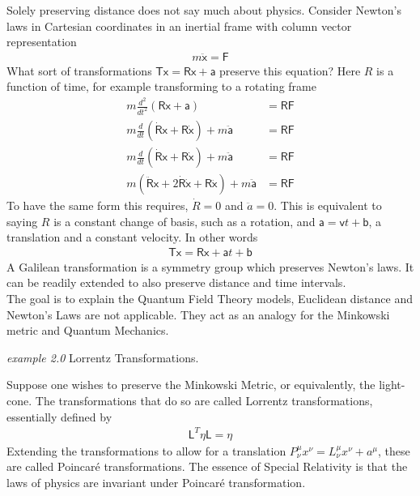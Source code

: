 \documentclass[twocolumn,floatfix,aps,prd,amsmath,amssymb]{revtex4}
\begin{document}
Solely preserving distance does not say much about physics. Consider Newton's laws in Cartesian coordinates in an inertial frame with column vector representation
\begin{align*}
m \ddot{\mathsf{x}} = \mathsf{F}
\end{align*}
What sort of transformations $\mathsf{Tx}=\mathsf{Rx}+\mathsf{a}$ preserve this equation? Here $R$ is a function of time, for example transforming to a rotating frame
\begin{align*} 
m \frac{d^2}{dt^2}(\mathsf{Rx+a}) &= \mathsf{RF} 
\\
m \frac{d}{dt}(\dot{\mathsf{R}} \mathsf{x} + \mathsf{R} \dot{\mathsf{x}} )+m\ddot{\mathsf{a}} &= \mathsf{RF} \\
m \frac{d}{dt}(\dot{\mathsf{R}} \mathsf{x} + \mathsf{R} \dot{\mathsf{x}} )+m\ddot{\mathsf{a}}&= \mathsf{RF} \\
m (\ddot{\mathsf{R}} \mathsf{x} + 2\dot{\mathsf{R}} \dot{\mathsf{x}}+\mathsf{R} \ddot{\mathsf{x}} )+m\ddot{\mathsf{a}} &= \mathsf{RF} 
\end{align*}
To have the same form this requires, $\dot{R}=0$ and $\ddot{a}=0$. This is equivalent to saying $R$ is a constant change of basis, such as a rotation, and $\mathsf{a} = \mathsf{v}t + \mathsf{b}$, a translation and a constant velocity. In other words
\begin{align*}
\mathsf{Tx} =  \mathsf{Rx} + \mathsf{a}t+\mathsf{b}
\end{align*}
A Galilean transformation is a symmetry group which preserves Newton's laws. It can be readily extended to also preserve distance and time intervals. \\

The goal is to explain the Quantum Field Theory models, Euclidean distance and Newton's Laws are not applicable. They act as an analogy for the Minkowski metric and Quantum Mechanics.

\begin{flushleft}\textit{example 2.0} Lorrentz Transformations. \end{flushleft}
Suppose one wishes to preserve the Minkowski Metric, or equivalently, the light-cone. The transformations that do so are called Lorrentz transformations, essentially defined by
\begin{align*}
\mathsf{L}^T \mathsf{\eta} \mathsf{L} = \mathsf{\eta}
\end{align*}
Extending the transformations to allow for a translation $P^\mu_\nu x^\nu = L^\mu_\nu x^\nu + a^\mu$, these are called Poincaré transformations. The essence of Special Relativity is that the laws of physics are invariant under Poincaré transformation.
\end{document}
